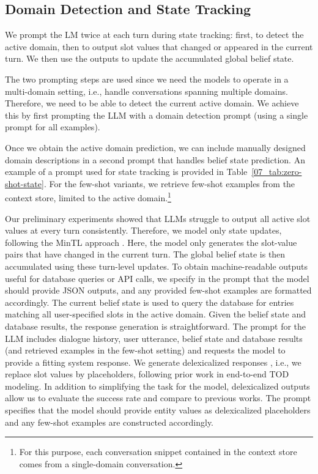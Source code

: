 \subsection{Domain Detection and State Tracking}
\label{07:sec:state-tracking}

We prompt the LM twice at each turn during state tracking: first, to detect the active domain, then to output slot values that changed or appeared in the current turn. We then use the outputs to update the accumulated global belief state.

The two prompting steps are used since 
we need the models to operate in a multi-domain setting, i.e., handle conversations spanning multiple domains.
Therefore, we need to be able to detect the current active domain.
We achieve this by first prompting the LLM with a domain detection prompt (using a single prompt for all examples).

Once we obtain the active domain prediction, we can include manually designed domain descriptions in a second prompt that handles belief state prediction.
An example of a prompt used for state tracking is provided in Table~\ref{07_tab:zero-shot-state}.
For the few-shot variants, %
we retrieve few-shot examples from the context store, limited to the active domain.\footnote{For this purpose, each conversation snippet contained in the context store comes from a single-domain conversation.}

Our preliminary experiments showed that LLMs struggle to output all active slot values at every turn consistently.
Therefore, we model only state updates, following the MinTL approach \cite{lin-etal-2020-mintl}.
Here, the model only generates the slot-value pairs that have changed in the current turn.
The global belief state is then accumulated using these turn-level updates.
To obtain machine-readable outputs useful for database queries or API calls,
we specify in the prompt that the model should provide JSON outputs, and any provided few-shot examples are formatted accordingly. 
The current belief state is used to query the database for entries matching all user-specified slots in the active domain. Given the belief state and database results, the response generation is straightforward.
The prompt for the LLM includes dialogue history, user utterance, belief state and database results (and retrieved examples in the few-shot setting) and requests the model to provide a fitting system response.
We generate delexicalized responses \cite{wen-etal-2015-stochastic}, i.e., we replace slot values by placeholders, following prior work in end-to-end TOD modeling.
In addition to simplifying the task for the model, delexicalized outputs allow us to evaluate the success rate and compare to previous works.
The prompt specifies that the model should provide entity values as delexicalized placeholders and any few-shot examples are constructed accordingly.

